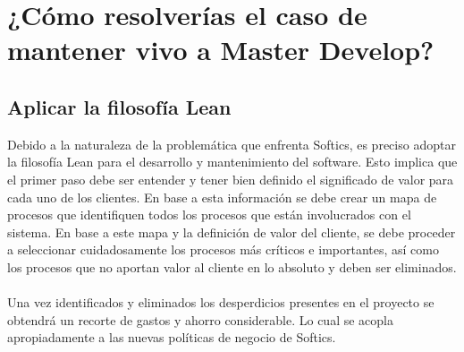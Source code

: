 \documentclass{article}
\begin{document}
\section{¿Cómo resolverías el caso de mantener vivo a Master Develop?}
\subsection{Aplicar la filosofía Lean}
Debido a la naturaleza de la problemática que enfrenta Softics, es preciso 
adoptar la filosofía Lean para el desarrollo y mantenimiento del software.
Esto implica que el primer paso debe ser entender y tener bien definido
el significado de valor para cada uno de los clientes. En base a esta
información se debe crear un mapa de procesos que identifiquen todos los
procesos que están involucrados con el sistema. En base a este mapa y 
la definición de valor del cliente, se debe proceder a seleccionar cuidadosamente
los procesos más críticos e importantes, así como los procesos que no aportan 
valor al cliente en lo absoluto y deben ser eliminados.
\\\\
Una vez identificados y eliminados los desperdicios presentes en el
proyecto se obtendrá un recorte de gastos y ahorro considerable.
Lo cual se acopla apropiadamente a las nuevas políticas de
negocio de Softics.
\end{document}
